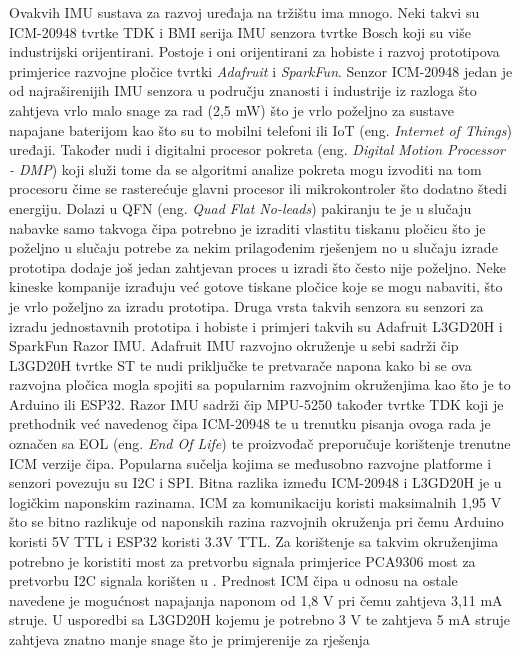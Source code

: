 \documentclass[times, utf8, diplomski]{fer}
\begin{document}
Ovakvih IMU sustava za razvoj uređaja na tržištu ima mnogo. Neki takvi su ICM-20948 tvrtke TDK i BMI serija IMU senzora tvrtke
Bosch koji su više industrijski orijentirani. Postoje i oni orijentirani za hobiste i razvoj prototipova primjerice razvojne pločice
tvrtki \textit{Adafruit} i \textit{SparkFun}. Senzor ICM-20948 jedan je od najraširenijih IMU senzora u području znanosti i
industrije iz razloga što zahtjeva vrlo malo snage za rad (2,5 mW) \citep{ICM} što je vrlo poželjno 
za sustave napajane baterijom kao što su to mobilni telefoni ili IoT (eng. \textit{Internet of Things}) uređaji.
Također nudi i digitalni procesor pokreta (eng. \textit{Digital Motion Processor - DMP}) koji služi tome da se algoritmi analize
pokreta mogu izvoditi na tom procesoru čime se rasterećuje glavni procesor ili mikrokontroler što dodatno štedi energiju. Dolazi u
QFN (eng. \textit{Quad Flat No-leads}) pakiranju te je u slučaju nabavke samo takvoga čipa potrebno je izraditi vlastitu tiskanu
pločicu što je poželjno u slučaju potrebe za nekim prilagođenim rješenjem no u slučaju izrade prototipa dodaje još jedan zahtjevan
proces u izradi što često nije poželjno. Neke kineske kompanije izrađuju već gotove tiskane pločice koje se mogu nabaviti, što je vrlo
poželjno za izradu prototipa. Druga vrsta takvih senzora su senzori za izradu jednostavnih prototipa i hobiste i primjeri takvih su
Adafruit L3GD20H i SparkFun Razor IMU. Adafruit IMU razvojno okruženje u sebi sadrži čip L3GD20H tvrtke ST te nudi priključke te
pretvarače napona kako bi se ova razvojna pločica mogla spojiti sa popularnim razvojnim okruženjima kao što je to Arduino ili
ESP32. Razor IMU sadrži čip MPU-5250 također tvrtke TDK koji je prethodnik već navedenog čipa ICM-20948 te u trenutku pisanja
ovoga rada je označen sa EOL (eng. \textit{End Of Life}) te proizvođač preporučuje korištenje trenutne ICM verzije čipa.
Popularna sučelja kojima se međusobno razvojne platforme i senzori povezuju su I2C i SPI. Bitna razlika između ICM-20948 i L3GD20H
je u logičkim naponskim razinama. ICM za komunikaciju koristi maksimalnih 1,95 V \citep{ICM} što se bitno razlikuje od naponskih
razina razvojnih okruženja pri čemu Arduino koristi 5V TTL i ESP32 koristi 3.3V TTL. Za korištenje sa takvim okruženjima potrebno je
koristiti most za pretvorbu signala primjerice PCA9306 most za pretvorbu I2C signala korišten u \cite{mini_data_capture}.
Prednost ICM čipa u odnosu na ostale navedene je mogućnost napajanja naponom od 1,8 V pri čemu zahtjeva 3,11 mA struje.
U usporedbi sa L3GD20H kojemu je potrebno 3 V te zahtjeva 5 mA struje zahtjeva znatno manje snage što je primjerenije za rješenja
\end{document}
